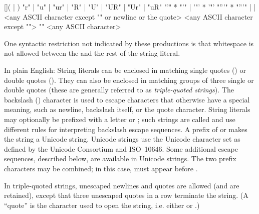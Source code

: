 \begin{productionlist}
             {[]( | )}
             {"r" | "u" | "ur" | "R" | "U" | "UR" | "Ur" | "uR"}
             {"'" * "'"
              | '"' * '"'}
             {"'''" * "'''"}
             { | }
             { | }
             {<any ASCII character except "\e" or newline or the quote>}
             {<any ASCII character except "\e">}
             {"\e" <any ASCII character>}
\end{productionlist}

One syntactic restriction not indicated by these productions is that
whitespace is not allowed between the  and
the rest of the string literal.

In plain English: String literals can be enclosed in matching single
quotes () or double quotes ().  They can also be
enclosed in matching groups of three single or double quotes (these
are generally referred to as \emph{triple-quoted strings}).  The
backslash (\code{\e}) character is used to escape characters that
otherwise have a special meaning, such as newline, backslash itself,
or the quote character.  String literals may optionally be prefixed
with a letter  or ; such strings are called
 and use different rules for
interpreting backslash escape sequences.  A prefix of  or
 makes the string a Unicode string.  Unicode strings use
the Unicode character set as defined by the Unicode Consortium and
ISO~10646.  Some additional escape sequences, described below, are
available in Unicode strings.  The two prefix characters may be
combined; in this case,  must appear before
.

In triple-quoted strings, unescaped newlines and quotes are allowed
(and are retained), except that three unescaped quotes in a row
terminate the string.  (A ``quote'' is the character used to open the
string, i.e. either  or .)


